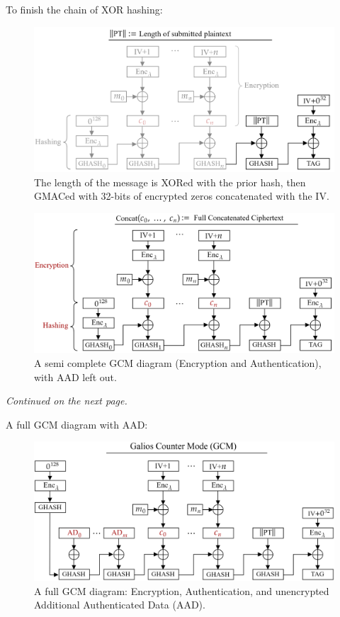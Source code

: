 \noindent
To finish the chain of XOR hashing:
\begin{figure}[h!]
    \centering
    \includegraphics[width=1\textwidth]{Sections/sec/enc/len.png}
    \caption{The length of the message is XORed with the prior hash, then GMACed with 32-bits of encrypted zeros concatenated with the IV.}
    \label{fig:block_cipher}
\end{figure}

\begin{figure}[h!]
    \centering

    \includegraphics[width=1\textwidth]{Sections/sec/enc/semi.png}
    \caption{A semi complete GCM diagram (Encryption and Authentication), with AAD left out.}
    \label{fig:block_cipher}
\end{figure}
\noindent
\vfill
\begin{center}
    \textit{Continued on the next page.}
\end{center}
\vfill 
\newpage

\noindent
A full GCM diagram with AAD:
\begin{figure}[h!]
    \centering
    \includegraphics[width=1\textwidth]{Sections/sec/enc/gcm.png}
    \caption{A full GCM diagram: Encryption, Authentication, and unencrypted Additional Authenticated Data (AAD).}
    \label{fig:block_cipher}
\end{figure}

\noindent

